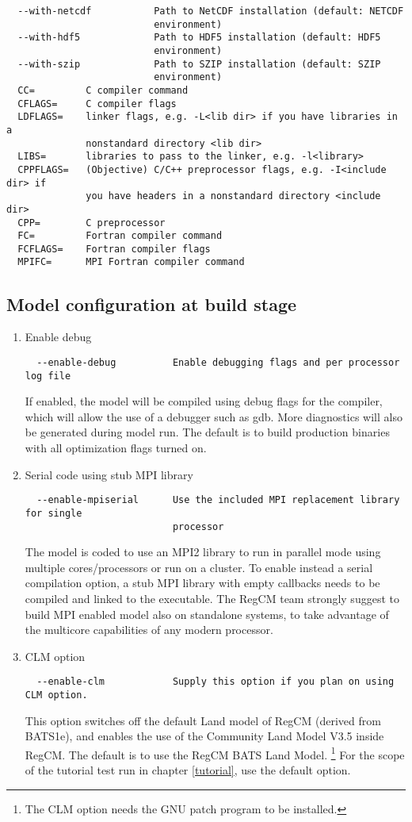 \begin{Verbatim}
  --with-netcdf           Path to NetCDF installation (default: NETCDF
                          environment)
  --with-hdf5             Path to HDF5 installation (default: HDF5
                          environment)
  --with-szip             Path to SZIP installation (default: SZIP
                          environment)
  CC=         C compiler command
  CFLAGS=     C compiler flags
  LDFLAGS=    linker flags, e.g. -L<lib dir> if you have libraries in a
              nonstandard directory <lib dir>
  LIBS=       libraries to pass to the linker, e.g. -l<library>
  CPPFLAGS=   (Objective) C/C++ preprocessor flags, e.g. -I<include dir> if
              you have headers in a nonstandard directory <include dir>
  CPP=        C preprocessor
  FC=         Fortran compiler command
  FCFLAGS=    Fortran compiler flags
  MPIFC=      MPI Fortran compiler command
\end{Verbatim}

\subsection{Model configuration at build stage}
\label{modconf}

\begin{enumerate}
\item Enable debug
\begin{Verbatim}
  --enable-debug          Enable debugging flags and per processor log file
\end{Verbatim}
If enabled, the model will be compiled using debug flags for the compiler,
which will allow the use of a debugger such as gdb. More diagnostics will
also be generated during model run.
The default is to build production binaries with all optimization flags
turned on.

\item Serial code using stub MPI library
\begin{Verbatim}
  --enable-mpiserial      Use the included MPI replacement library for single
                          processor
\end{Verbatim}
The model is coded to use an MPI2 library to run in parallel mode using
multiple cores/processors or run on a cluster. To enable instead a serial
compilation option, a stub MPI library with empty callbacks needs to be
compiled and linked to the executable.
The RegCM team strongly suggest to build MPI enabled model also on standalone
systems, to take advantage of the multicore capabilities of any modern
processor.
\item CLM option
\begin{Verbatim}
  --enable-clm            Supply this option if you plan on using CLM option.
\end{Verbatim}
This option switches off the default Land model of RegCM (derived from BATS1e),
and enables the use of the Community Land Model V3.5 inside RegCM. The default
is to use the RegCM BATS Land Model.
\footnote{The CLM option needs the GNU patch program to be installed.}
For the scope of the tutorial test run in chapter \ref{tutorial}, use the
default option.
\end{enumerate}


